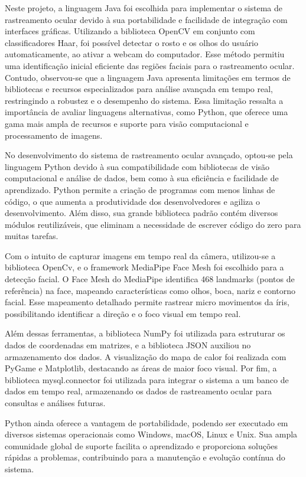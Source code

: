 Neste projeto, a linguagem Java foi escolhida para implementar o sistema de rastreamento ocular devido à sua portabilidade e facilidade de integração com interfaces gráficas. Utilizando a biblioteca OpenCV em conjunto com classificadores Haar, foi possível detectar o rosto e os olhos do usuário automaticamente, ao ativar a webcam do computador. Esse método permitiu uma identificação inicial eficiente das regiões faciais para o rastreamento ocular. Contudo, observou-se que a linguagem Java apresenta limitações em termos de bibliotecas e recursos especializados para análise avançada em tempo real, restringindo a robustez e o desempenho do sistema. Essa limitação ressalta a importância de avaliar linguagens alternativas, como Python, que oferece uma gama mais ampla de recursos e suporte para visão computacional e processamento de imagens.

No desenvolvimento do sistema de rastreamento ocular avançado, optou-se pela linguagem Python devido à sua compatibilidade com bibliotecas de visão computacional e análise de dados, bem como à sua eficiência e facilidade de aprendizado. Python permite a criação de programas com menos linhas de código, o que aumenta a produtividade dos desenvolvedores e agiliza o desenvolvimento. Além disso, sua grande biblioteca padrão contém diversos módulos reutilizáveis, que eliminam a necessidade de escrever código do zero para muitas tarefas. \textcite{Amazon}

Com o intuito de capturar imagens em tempo real da câmera, utilizou-se a biblioteca OpenCv, e o framework MediaPipe Face Mesh foi escolhido para a detecção facial. O Face Mesh do MediaPipe identifica 468 landmarks (pontos de referência) na face, mapeando características como olhos, boca, nariz e contorno facial. Esse mapeamento detalhado permite rastrear micro movimentos da íris, possibilitando identificar a direção e o foco visual em tempo real.

Além dessas ferramentas, a biblioteca NumPy foi utilizada para estruturar os dados de coordenadas em matrizes, e a biblioteca JSON auxiliou no armazenamento dos dados. A visualização do mapa de calor foi realizada com PyGame e Matplotlib, destacando as áreas de maior foco visual. Por fim, a biblioteca mysql.connector foi utilizada para integrar o sistema a um banco de dados em tempo real, armazenando os dados de rastreamento ocular para consultas e análises futuras.

Python ainda oferece a vantagem de portabilidade, podendo ser executado em diversos sistemas operacionais como Windows, macOS, Linux e Unix. Sua ampla comunidade global de suporte facilita o aprendizado e proporciona soluções rápidas a problemas, contribuindo para a manutenção e evolução contínua do sistema. \textcite{Amazon}

